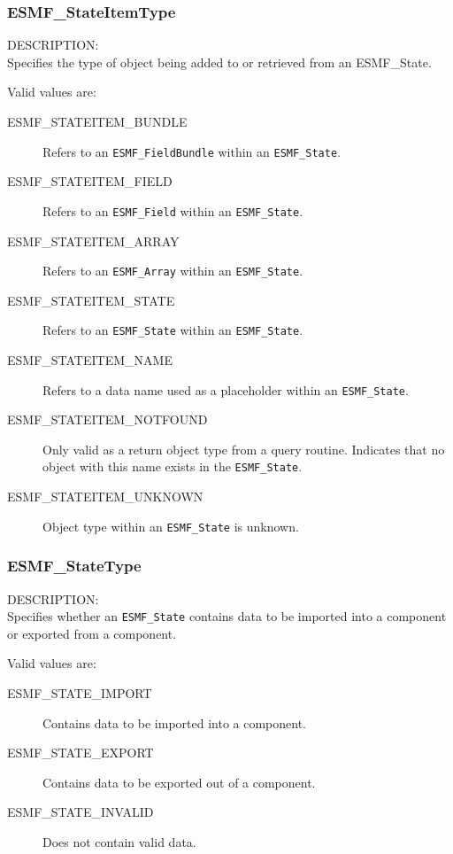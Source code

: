 
\subsubsection{ESMF\_StateItemType}
\label{opt:stateitemtype}

{\sf DESCRIPTION:\\}
Specifies the type of object being added to or retrieved from an
{ESMF\_State.}

Valid values are:
\begin{description}
   \item [ESMF\_STATEITEM\_BUNDLE] 
         Refers to an {\tt ESMF\_FieldBundle} within an {\tt ESMF\_State}.
   \item [ESMF\_STATEITEM\_FIELD]
         Refers to an {\tt ESMF\_Field} within an {\tt ESMF\_State}.
   \item [ESMF\_STATEITEM\_ARRAY]
         Refers to an {\tt ESMF\_Array} within an {\tt ESMF\_State}.
   \item [ESMF\_STATEITEM\_STATE]
         Refers to an {\tt ESMF\_State} within an {\tt ESMF\_State}.
   \item [ESMF\_STATEITEM\_NAME]
         Refers to a data name used as a placeholder within 
         an {\tt ESMF\_State}.
   \item [ESMF\_STATEITEM\_NOTFOUND]
         Only valid as a return object type from a query routine.  Indicates
         that no object with this name exists in the {\tt ESMF\_State}.
   \item [ESMF\_STATEITEM\_UNKNOWN]
         Object type within an {\tt ESMF\_State} is unknown.
\end{description}

\subsubsection{ESMF\_StateType}
\label{opt:statetype}
{\sf DESCRIPTION:\\}
Specifies whether an {\tt ESMF\_State} contains data to be imported
into a component or exported from a component. 

Valid values are:
\begin{description}
   \item [ESMF\_STATE\_IMPORT] 
         Contains data to be imported into a component.
   \item [ESMF\_STATE\_EXPORT]
         Contains data to be exported out of a component.
   \item [ESMF\_STATE\_INVALID]
         Does not contain valid data.
\end{description}














